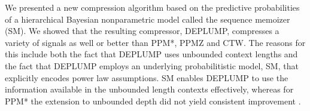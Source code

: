 We presented a new compression algorithm based on the predictive probabilities of a hierarchical Bayesian nonparametric model called the sequence memoizer (SM).  We showed that the resulting compressor, DEPLUMP, compresses a variety of signals as well or better than PPM*, PPMZ and CTW.  The reasons for this include both the fact that DEPLUMP uses unbounded context lengths and the fact that DEPLUMP employs an underlying probabilitistic model, SM, that explicitly encodes power law assumptions. SM enables DEPLUMP to use the information available in the unbounded length contexts effectively, whereas for PPM* the extension to unbounded depth did not yield consistent improvement \citep{bunton1997smi}. 




